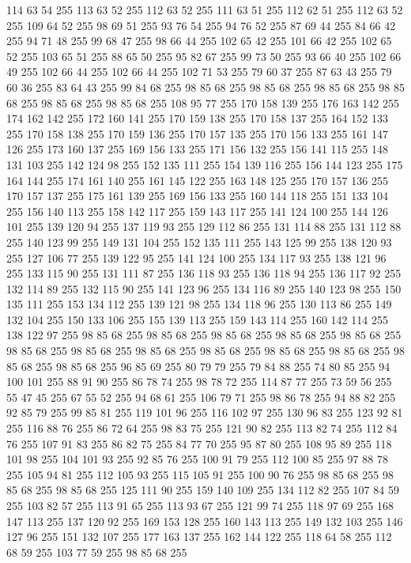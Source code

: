 114 63 54 255 113 63 52 255 112 63 52 255 111 63 51 255 112 62 51 255 112 63 52 255 109 64 52 255 98 69 51 255 93 76 54 255 94 76 52 255 87 69 44 255 84 66 42 255 94 71 48 255 99 68 47 255 98 66 44 255 102 65 42 255 101 66 42 255 102 65 52 255 103 65 51 255 88 65 50 255 95 82 67 255 99 73 50 255 93 66 40 255 102 66 49 255 102 66 44 255 102 66 44 255 102 71 53 255 79 60 37 255 87 63 43 255 79 60 36 255 83 64 43 255 99 84 68 255 98 85 68 255 98 85 68 255 98 85 68 255 98 85 68 255 98 85 68 255 98 85 68 255 108 95 77 255 170 158 139 255 176 163 142 255 174 162 142 255 172 160 141 255 170 159 138 255 170 158 137 255 164 152 133 255 170 158 138 255 170 159 136 255 170 157 135 255 170 156 133 255 161 147 126 255 173 160 137 255 169 156 133 255 171 156 132 255 156 141 115 255 148 131 103 255 142 124 98 255 152 135 111 255 154 139 116 255 156 144 123 255 175 164 144 255 174 161 140 255 161 145 122 255 163 148 125 255
170 157 136 255 170 157 137 255 175 161 139 255 169 156 133 255 160 144 118 255 151 133 104 255 156 140 113 255 158 142 117 255 159 143 117 255 141 124 100 255 144 126 101 255 139 120 94 255 137 119 93 255 129 112 86 255 131 114 88 255 131 112 88 255 140 123 99 255 149 131 104 255 152 135 111 255 143 125 99 255 138 120 93 255 127 106 77 255 139 122 95 255 141 124 100 255 134 117 93 255 138 121 96 255 133 115 90 255 131 111 87 255 136 118 93 255 136 118 94 255 136 117 92 255 132 114 89 255 132 115 90 255 141 123 96 255 134 116 89 255 140 123 98 255 150 135 111 255 153 134 112 255 139 121 98 255 134 118 96 255 130 113 86 255 149 132 104 255 150 133 106 255 155 139 113 255 159 143 114 255 160 142 114 255 138 122 97 255 98 85 68 255 98 85 68 255 98 85 68 255 98 85 68 255 98 85 68 255 98 85 68 255 98 85 68 255 98 85 68 255 98 85 68 255 98 85 68 255 98 85 68 255 98 85 68 255 98 85 68 255 96 85 69 255 80 79 79 255 79 84 88 255 74 80 85 255
94 100 101 255 88 91 90 255 86 78 74 255 98 78 72 255 114 87 77 255 73 59 56 255 55 47 45 255 67 55 52 255 94 68 61 255 106 79 71 255 98 86 78 255 94 88 82 255 92 85 79 255 99 85 81 255 119 101 96 255 116 102 97 255 130 96 83 255 123 92 81 255 116 88 76 255 86 72 64 255 98 83 75 255 121 90 82 255 113 82 74 255 112 84 76 255 107 91 83 255 86 82 75 255 84 77 70 255 95 87 80 255 108 95 89 255 118 101 98 255 104 101 93 255 92 85 76 255 100 91 79 255 112 100 85 255 97 88 78 255 105 94 81 255 112 105 93 255 115 105 91 255 100 90 76 255 98 85 68 255 98 85 68 255 98 85 68 255 125 111 90 255 159 140 109 255 134 112 82 255 107 84 59 255 103 82 57 255 113 91 65 255 113 93 67 255 121 99 74 255 118 97 69 255 168 147 113 255 137 120 92 255 169 153 128 255 160 143 113 255 149 132 103 255 146 127 96 255 151 132 107 255 177 163 137 255 162 144 122 255 118 64 58 255 112 68 59 255 103 77 59 255 98 85 68 255
